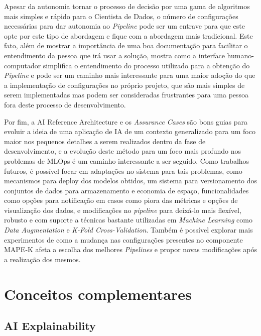 \documentclass[portugues]{ic-tese}
\begin{document}
Apesar da autonomia tornar o processo de decisão por uma gama de algoritmos mais simples e rápido para o Cientista de Dados, o número de configurações necessárias para dar autonomia ao \textit{Pipeline} pode ser um entrave para que este opte por este tipo de abordagem e fique com a abordagem mais tradicional. Este fato, além de mostrar a importância de uma boa documentação para facilitar o entendimento da pessoa que irá usar a solução, mostra como a interface humano-computador simplifica o entendimento do processo utilizado para a obtenção do \textit{Pipeline} e pode ser um caminho mais interessante para uma maior adoção do que a implementação de configurações no próprio projeto, que são mais simples de serem implementadas mas podem ser consideradas frustrantes para uma pessoa fora deste processo de desenvolvimento.

Por fim, a AI Reference Architecture e os \textit{Assurance Cases} são bons guias para evoluir a ideia de uma aplicação de IA de um contexto generalizado para um foco maior nos pequenos detalhes a serem realizados dentro da fase de desenvolvimento, e a evolução deste método para um foco mais profundo nos problemas de MLOps é um caminho interessante a ser seguido. Como trabalhos futuros, é possível focar em adaptações no sistema para tais problemas, como mecanismos para deploy dos modelos obtidos, um sistema para versionamento dos conjuntos de dados para armazenamento e economia de espaço, funcionalidades como opções para notificação em casos como piora das métricas e opções de visualização dos dados, e modificações no \textit{pipeline} para deixá-lo mais flexível, robusto e com suporte a técnicas bastante utilizadas em \textit{Machine Learning} como \textit{Data Augmentation} e \textit{K-Fold Cross-Validation}. Também é possível explorar mais experimentos de como a mudança nas configurações presentes no componente MAPE-K afeta a escolha dos melhores \textit{Pipelines} e propor novas modificações após a realização dos mesmos.




\appendix
\chapter{Conceitos complementares}

\section{AI Explainability}
\label{app:AIExplainability}
\end{document}
